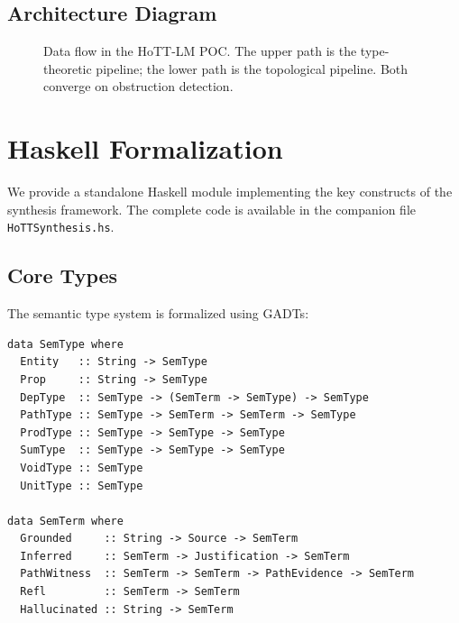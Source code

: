 \documentclass[11pt,a4paper]{article}
\theoremstyle{plain}
\theoremstyle{definition}
\theoremstyle{remark}
\newcommand{\Sem}{\mathbf{Sem}}
\newcommand{\Vect}{\mathbf{Vect}}
\newcommand{\VR}{\mathrm{VR}}
\newcommand{\Detect}{\mathsf{Detect}}
\begin{document}
\subsection{Architecture Diagram}

\begin{figure}[H]
\centering
{}
\caption{Data flow in the HoTT-LM POC. The upper path is the type-theoretic pipeline; the lower path is the topological pipeline. Both converge on obstruction detection.}\label{fig:dataflow}
\end{figure}


\section{Haskell Formalization}\label{sec:haskell}

We provide a standalone Haskell module implementing the key constructs of the synthesis framework. The complete code is available in the companion file \texttt{HoTTSynthesis.hs}.

\subsection{Core Types}

The semantic type system is formalized using GADTs:

\begin{lstlisting}[caption={Semantic types and terms}]
data SemType where
  Entity   :: String -> SemType
  Prop     :: String -> SemType
  DepType  :: SemType -> (SemTerm -> SemType) -> SemType
  PathType :: SemType -> SemTerm -> SemTerm -> SemType
  ProdType :: SemType -> SemType -> SemType
  SumType  :: SemType -> SemType -> SemType
  VoidType :: SemType
  UnitType :: SemType

data SemTerm where
  Grounded     :: String -> Source -> SemTerm
  Inferred     :: SemTerm -> Justification -> SemTerm
  PathWitness  :: SemTerm -> SemTerm -> PathEvidence -> SemTerm
  Refl         :: SemTerm -> SemTerm
  Hallucinated :: String -> SemTerm
\end{lstlisting}
\end{document}
